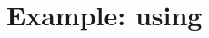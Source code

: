 \documentclass[12pt]{article}
\begin{document}
\section{Example: using \libint}

%
%
%




\end{document}
